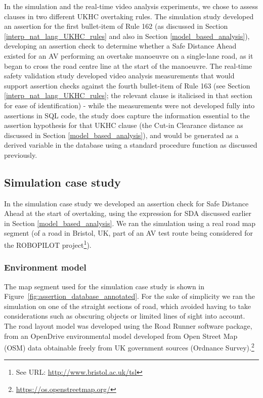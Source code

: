 
In the simulation and the real-time video analysis experiments, we chose to assess clauses in two different UKHC overtaking rules. The simulation study developed an assertion for the first bullet-item of Rule 162 (as discussed in Section \ref{interp_nat_lang_UKHC_rules} and also in Section \ref{model_based_analysis}), developing an assertion check to determine whether a Safe Distance Ahead existed for an AV performing an overtake manoeuvre on a single-lane road, as it began to cross the road centre line at the start of the manoeuvre. The real-time safety validation study developed video analysis measurements that would support assertion checks against the fourth bullet-item of Rule 163 (see Section \ref{interp_nat_lang_UKHC_rules}; the relevant clause is italicised in that section for ease of identification) - while the measurements were not developed fully into assertions in SQL code, the study does capture the information essential to the assertion hypothesis for that UKHC clause (the Cut-in Clearance distance as discussed in Section \ref{model_based_analysis}), and would be generated as a derived variable in the database using a standard procedure function as discussed previously.

\subsection{Simulation case study}  \label{sim_case_study}
In the simulation case study we developed an assertion check for Safe Distance Ahead at the start of overtaking, using the expression for SDA discussed earlier in Section \ref{model_based_analysis}. We ran the simulation using a real road map segment (of a road in Bristol, UK, part of an AV test route being considered for the ROBOPILOT project\footnote{See URL: \url{http://www.bristol.ac.uk/tsl}}).

\subsubsection{Environment model}
The map segment used for the simulation case study is shown in 
Figure~\ref{fig:assertion_database_annotated}. For the sake of simplicity we ran the simulation on one of the straight sections of road, which avoided having to take considerations such as obscuring objects or limited lines of sight into account. The road layout model was developed using the Road Runner software package, from an OpenDrive environmental model developed from Open Street Map (OSM) data obtainable freely from UK government sources (Ordnance Survey).\footnote{\url{https://os.openstreetmap.org/}} 

